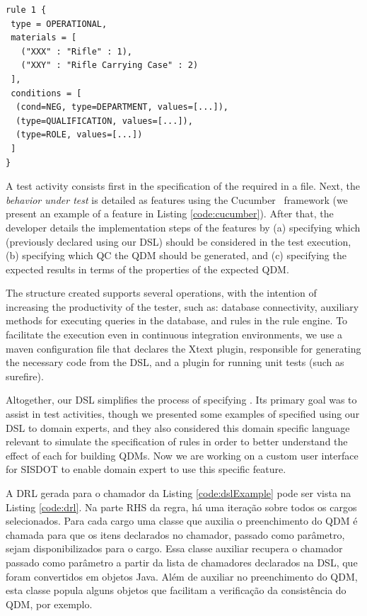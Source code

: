 \begin{small}
\begin{lstlisting}[frame=single, language=DSL, caption={\it Example of a \shc declaration using our DSL}, label={code:dslExample}]
rule 1 { 
 type = OPERATIONAL, 
 materials = [ 
   ("XXX" : "Rifle" : 1), 
   ("XXY" : "Rifle Carrying Case" : 2)
 ], 
 conditions = [ 
  (cond=NEG, type=DEPARTMENT, values=[...]),
  (type=QUALIFICATION, values=[...]), 
  (type=ROLE, values=[...])
 ]
}
\end{lstlisting}
\end{small}


A test activity consists first in the specification of the required \callers in a file. Next, the \emph{behavior under 
test} is detailed as features using the Cucumber~\cite{wynne2017cucumber} framework (we present an 
example of a feature in Listing \ref{code:cucumber}). After that, the developer details 
the implementation steps of the features by (a) specifying which \callers (previously declared using our DSL) should be considered 
in the test execution, (b) specifying which QC the QDM should be generated, and (c) specifying the expected results in terms 
of the properties of the expected QDM. 

The structure created supports several operations, with the intention 
of increasing the productivity of the tester, such as: database connectivity, auxiliary methods for executing queries 
in the database, and rules in the rule engine. To facilitate the execution even in continuous integration 
environments, we use a maven configuration file that declares the Xtext plugin, responsible for 
generating the necessary code from the DSL, and a plugin for running unit tests (such as surefire).


Altogether, our DSL simplifies the process of specifying \callers. Its primary goal was to 
assist in test activities, though we presented some examples of \callers specified using 
our DSL to domain experts, and they also considered this domain specific language relevant 
to simulate the specification of rules in order to better understand the effect of each 
\shc for building QDMs. Now we are working on a custom user interface for SISDOT to enable domain 
expert to use this specific feature. 


 {\color{red}A DRL gerada para o chamador da Listing \ref{code:dslExample} pode ser vista na} Listing \ref{code:drl}.  {\color{red} Na parte RHS da regra, há uma iteração sobre todos os cargos selecionados. Para cada cargo uma classe que auxilia o preenchimento do QDM é chamada para que os itens declarados no chamador, passado como parâmetro, sejam disponibilizados para o cargo. Essa classe auxiliar recupera o chamador passado como parâmetro a partir da lista de chamadores declarados na DSL, que foram convertidos em objetos Java. Além de auxiliar no preenchimento do QDM, esta classe popula alguns objetos que facilitam a verificação da consistência do QDM, por exemplo.}

